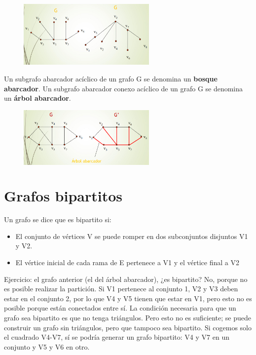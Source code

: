 \begin{figure}[h]
\centering
\includegraphics[width = 0.6\textwidth]{figs/arbol-bosque.png}
\end{figure}

Un subgrafo abarcador acíclico de un grafo G se denomina un \textbf{bosque abarcador}. Un subgrafo abarcador conexo acíclico de un grafo G se denomina un \textbf{árbol abarcador}.

\begin{figure}[h]
\centering
\includegraphics[width = 0.6\textwidth]{figs/arbol-abarcador.png}
\end{figure}

\section{Grafos bipartitos}
Un grafo se dice que es bipartito si:
\begin{itemize}
\item El conjunto de vértices V se puede romper en dos subconjuntos disjuntos V1 y V2.
\item El vértice inicial de cada rama de E pertenece a V1 y el vértice final a V2
\end{itemize}

Ejercicio: el grafo anterior (el del árbol abarcador), ¿es bipartito? No, porque no es posible realizar la partición. Si V1 pertenece al conjunto 1, V2 y V3 deben estar en el conjunto 2, por lo que V4 y V5 tienen que estar en V1, pero esto no es posible porque están conectados entre sí. La condición necesaria para que un grafo sea bipartito es que no tenga triángulos. Pero esto no es suficiente; se puede construir un grafo sin triángulos, pero que tampoco sea bipartito. Si cogemos solo el cuadrado V4-V7, sí se podría generar un grafo bipartito: V4 y V7 en un conjunto y V5 y V6 en otro. 

